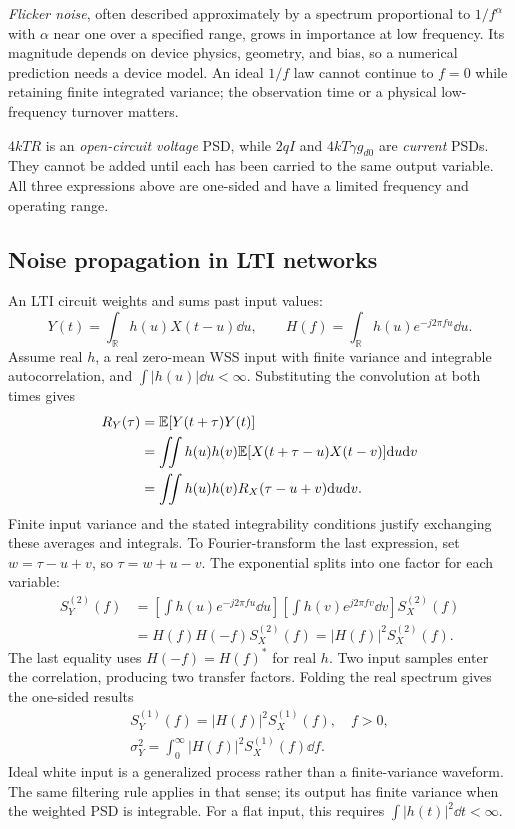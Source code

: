 \emph{Flicker noise}, often described approximately by a spectrum proportional to $1/f^\alpha$ with $\alpha$ near one over a specified range, grows in importance at low frequency. Its magnitude depends on device physics, geometry, and bias, so a numerical prediction needs a device model. An ideal $1/f$ law cannot continue to $f=0$ while retaining finite integrated variance; the observation time or a physical low-frequency turnover matters.

\begin{concept}[title={Source quantities and units}]
$4kTR$ is an \emph{open-circuit voltage} PSD, while $2qI$ and $4kT\gamma g_{d0}$ are \emph{current} PSDs. They cannot be added until each has been carried to the same output variable. All three expressions above are one-sided and have a limited frequency and operating range.
\end{concept}


\subsection{Noise propagation in LTI networks}
An LTI circuit weights and sums past input values:
\[
Y(t)=\int_{\mathbb R}h(u)X(t-u)\dd u,\qquad
H(f)=\int_{\mathbb R}h(u)e^{-j2\pi fu}\dd u.
\]
Assume real $h$, a real zero-mean WSS input with finite variance and integrable autocorrelation, and $\int|h(u)|\dd u<\infty$. Substituting the convolution at both times gives
\begin{align*}
R_Y(\tau)&=\mathbb E[Y(t+\tau)Y(t)]\\
&=\iint h(u)h(v)\mathbb E[X(t+\tau-u)X(t-v)]\mathrm d u\mathrm d v\\
&=\iint h(u)h(v)R_X(\tau-u+v)\mathrm d u\mathrm d v.
\end{align*}
Finite input variance and the stated integrability conditions justify exchanging these averages and integrals. To Fourier-transform the last expression, set $w=\tau-u+v$, so $\tau=w+u-v$. The exponential splits into one factor for each variable:
\begin{align*}
S_Y^{(2)}(f)
&=\left[\int h(u)e^{-j2\pi fu}\dd u\right]
\left[\int h(v)e^{j2\pi fv}\dd v\right]S_X^{(2)}(f)\\
&=H(f)H(-f)S_X^{(2)}(f)=|H(f)|^2S_X^{(2)}(f).
\end{align*}
The last equality uses $H(-f)=H(f)^*$ for real $h$. Two input samples enter the correlation, producing two transfer factors. Folding the real spectrum gives the one-sided results
\begin{align}
\boxed{S_Y^{(1)}(f)=|H(f)|^2S_X^{(1)}(f),\quad f>0,}\label{eq:lti}\\
\boxed{\sigma_Y^2=\int_0^\infty|H(f)|^2S_X^{(1)}(f)\dd f.}\label{eq:outvariance}
\end{align}
Ideal white input is a generalized process rather than a finite-variance waveform. The same filtering rule applies in that sense; its output has finite variance when the weighted PSD is integrable. For a flat input, this requires $\int|h(t)|^2\dd t<\infty$.


